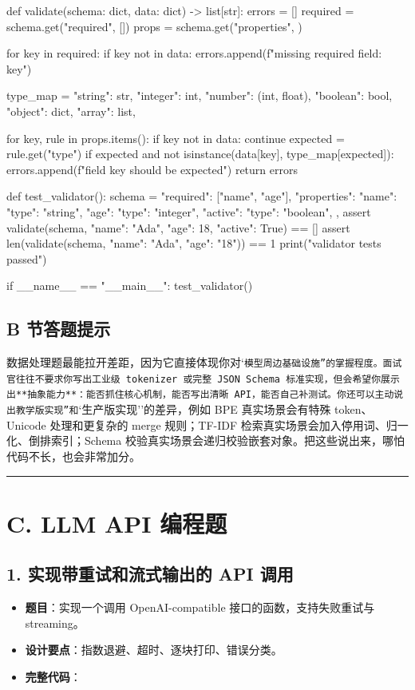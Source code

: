 \begin{codeblock}

def validate(schema: dict, data: dict) -> list[str]:
    errors = []
    required = schema.get("required", [])
    props = schema.get("properties", {})

    for key in required:
        if key not in data:
            errors.append(f"missing required field: {key}")

    type_map = {
        "string": str,
        "integer": int,
        "number": (int, float),
        "boolean": bool,
        "object": dict,
        "array": list,
    }

    for key, rule in props.items():
        if key not in data:
            continue
        expected = rule.get("type")
        if expected and not isinstance(data[key], type_map[expected]):
            errors.append(f"field {key} should be {expected}")
    return errors


def test_validator():
    schema = {
        "required": ["name", "age"],
        "properties": {
            "name": {"type": "string"},
            "age": {"type": "integer"},
            "active": {"type": "boolean"},
        },
    }
    assert validate(schema, {"name": "Ada", "age": 18, "active": True}) == []
    assert len(validate(schema, {"name": "Ada", "age": "18"})) == 1
    print("validator tests passed")


if __name__ == "__main__":
    test_validator()
\end{codeblock}

\subsection{B 节答题提示}
数据处理题最能拉开差距，因为它直接体现你对`\texttt{模型周边基础设施''的掌握程度。面试官往往不要求你写出工业级 tokenizer 或完整 JSON Schema 标准实现，但会希望你展示出**抽象能力**：能否抓住核心机制，能否写出清晰 API，能否自己补测试。你还可以主动说出}\texttt{教学版实现''和}`生产版实现''的差异，例如 BPE 真实场景会有特殊 token、Unicode 处理和更复杂的 merge 规则；TF-IDF 检索真实场景会加入停用词、归一化、倒排索引；Schema 校验真实场景会递归校验嵌套对象。把这些说出来，哪怕代码不长，也会非常加分。


\bigskip\hrule\bigskip

\section{C. LLM API 编程题}

\subsection{1. 实现带重试和流式输出的 API 调用}
\begin{itemize}[leftmargin=2em]
\item \textbf{题目}：实现一个调用 OpenAI-compatible 接口的函数，支持失败重试与 streaming。
\item \textbf{设计要点}：指数退避、超时、逐块打印、错误分类。
\item \textbf{完整代码}：
\end{itemize}

